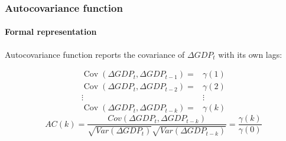 \begin{frame}
    \frametitle{Autocovariance function}
    \framesubtitle{Formal representation}
    \begin{center}
        Autocovariance function reports the covariance of ${\Delta GDP}_t$ with its own lags:
    \end{center}
    \[
        \begin{array}{ccc}
            \operatorname{Cov}\left({\Delta GDP}_t, {\Delta GDP}_{t-1}\right)= & \gamma(1) \\
            \operatorname{Cov}\left({\Delta GDP}_t, {\Delta GDP}_{t-2}\right)= & \gamma(2) \\
            \vdots                                                             & \vdots    \\
            \operatorname{Cov}\left({\Delta GDP}_t, {\Delta GDP}_{t-k}\right)= & \gamma(k)
        \end{array}
    \]
    $$AC(k)=\dfrac{Cov\left({\Delta GDP}_{t},{\Delta GDP}_{t-k}\right)}{\sqrt{Var({\Delta GDP}_{t})}\sqrt{Var({\Delta GDP}_{t-k})}}=\dfrac{\gamma\left(k\right)}{\gamma\left(0\right)}$$
\end{frame}